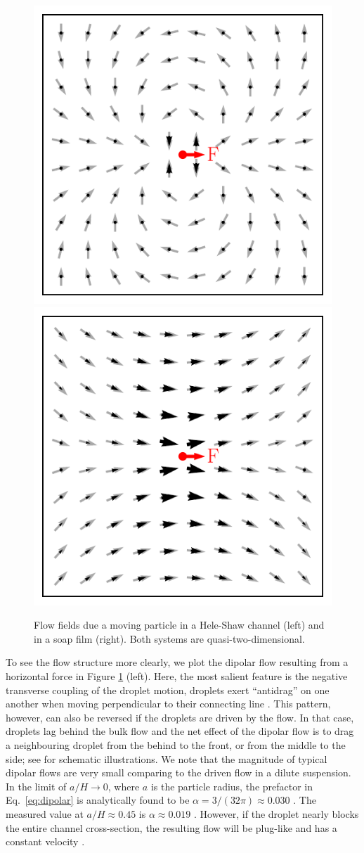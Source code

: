 \begin{figure}%
  \centering
  \includegraphics[width=0.49\columnwidth]{dipolar.pdf}
  \includegraphics[width=0.49\columnwidth]{soap.pdf}
  \caption{Flow fields due a moving particle in a Hele-Shaw channel (left) and in a soap film (right). Both systems are quasi-two-dimensional.}
  \label{fig:q2d}
\end{figure}

To see the flow structure more clearly, we plot the dipolar flow resulting from a horizontal force in Figure \ref{fig:q2d} (left).
Here, the most salient feature is the negative transverse coupling of the droplet motion, \ie droplets exert ``antidrag'' on one another when moving perpendicular to their connecting line \citep{Cui2004}.
This pattern, however, can also be reversed if the droplets are driven by the flow.
In that case, droplets lag behind the bulk flow and the net effect of the dipolar flow is to drag a neighbouring droplet from the behind to the front, or from the middle to the side; see \cite{Beatus2006} for schematic illustrations.
We note that the magnitude of typical dipolar flows are very small comparing to the driven flow in a dilute suspension.
In the limit of $a/H \to 0$, where $a$ is the particle radius, the prefactor in Eq.\ \eqref{eq:dipolar} is analytically found to be $\alpha=3/(32\pi)\approx 0.030$ \citep{LironMochon}.
The measured value at $a/H \approx 0.45$ is $\alpha \approx 0.019$ \citep{Diamant_2005}.
However, if the droplet nearly blocks the entire channel cross-section, the resulting flow will be plug-like and has a constant velocity \citep{q2d_Beatus}.

